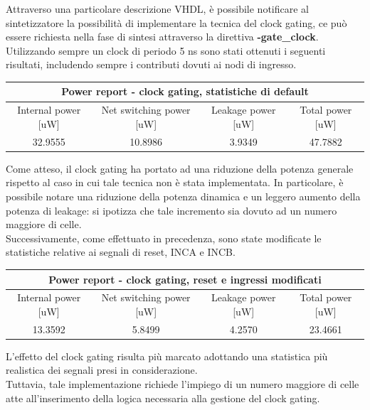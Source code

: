 \documentclass[11pt,  english, makeidx, a4paper, titlepage, oneside]{book}
\begin{document}
\vspace{0.3cm}
Attraverso una particolare descrizione VHDL, è possibile notificare al sintetizzatore la possibilità di implementare la tecnica del clock gating, ce può essere richiesta nella fase di sintesi attraverso la direttiva \textbf{-gate\_clock}.
Utilizzando sempre un clock di periodo 5 ns sono stati ottenuti i seguenti risultati, includendo sempre i contributi dovuti ai nodi di ingresso.       
\\
\begin{center}
	\begin{tabular}{|c|c|c|c|}
	\hline
	\multicolumn{4}{c}{Power report - clock gating, statistiche di default}\\
	\hline
	Internal power [uW] & Net switching power [uW] & Leakage power [uW] & Total power [uW] \\
	\hline
	 32.9555 & 10.8986  & 3.9349  &  47.7882 \\
	\hline
	\end{tabular}	
\end{center}
\vspace{0.3cm}         
Come atteso, il clock gating ha portato ad una riduzione della potenza generale rispetto al caso in cui tale tecnica non è stata implementata. In particolare, è possibile notare una riduzione della potenza dinamica e un leggero aumento della potenza di leakage: si ipotizza che tale incremento sia dovuto ad un numero maggiore di celle.
\\
Successivamente, come effettuato in precedenza, sono state modificate le statistiche relative ai segnali di reset, INCA e INCB.
\begin{center}
	\begin{tabular}{|c|c|c|c|}
	\hline
	\multicolumn{4}{c}{Power report - clock gating, reset e ingressi modificati}\\
	\hline
	Internal power [uW] & Net switching power [uW] & Leakage power [uW] & Total power [uW] \\
	\hline
	 13.3592 & 5.8499  & 4.2570  &  23.4661 \\
	\hline
	\end{tabular}	
\end{center}
\vspace{0.3cm}        
L'effetto del clock gating risulta più marcato adottando una statistica più realistica dei segnali presi in considerazione.
\\
Tuttavia, tale implementazione richiede l'impiego di un numero maggiore di celle atte all'inserimento della logica necessaria alla gestione del clock gating.     
\end{document}
